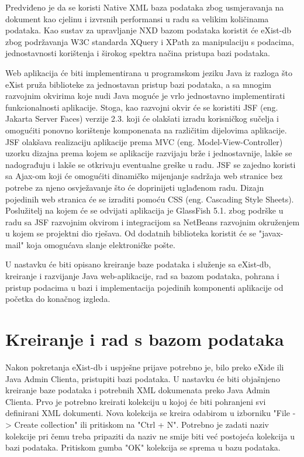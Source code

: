 \documentclass{foi}
\begin{document}
Predviđeno je da se koristi Native XML baza podataka zbog usmjeravanja na dokument kao cjelinu i izvrsnih performansi u radu sa velikim količinama podataka. Kao sustav za upravljanje NXD bazom podataka koristit će eXist-db zbog podržavanja W3C standarda XQuery i XPath za manipulaciju s podacima, jednostavnosti korištenja i širokog spektra načina pristupa bazi podataka.

Web aplikacija će biti implementirana u programskom jeziku Java iz razloga što eXist pruža biblioteke za jednostavan pristup bazi podataka, a sa mnogim razvojnim okvirima koje nudi Java moguće je vrlo jednostavno implementirati funkcionalnosti aplikacije. Stoga, kao razvojni okvir će se koristiti JSF (eng. Jakarta Server Faces) verzije 2.3. koji će olakšati izradu korisničkog sučelja i omogućiti ponovno korištenje komponenata na različitim dijelovima aplikacije. JSF olakšava realizaciju aplikacije prema MVC (eng. Model-View-Controller) uzorku dizajna prema kojem se aplikacije razvijaju brže i jednostavnije, lakše se nadograđuju i lakše se otkrivaju eventualne greške u radu. JSF se zajedno koristi sa Ajax-om koji će omogućiti dinamičko mijenjanje sadržaja web stranice bez potrebe za njeno osvježavanje što će doprinijeti uglađenom radu. Dizajn pojedinih web stranica će se izraditi pomoću CSS (eng. Cascading Style Sheets). Poslužitelj na kojem će se odvijati aplikacija je GlassFish 5.1. zbog podrške u radu sa JSF razvojnim okvirom i integracijom sa NetBeans razvojnim okruženjem u kojem se projektni dio rješava. Od dodatnih biblioteka koristit će se "javax-mail" koja omogućava slanje elektroničke pošte.

U nastavku će biti opisano kreiranje baze podataka i služenje sa eXist-db, kreiranje i razvijanje Java web-aplikacije, rad sa bazom podataka, pohrana i pristup podacima u bazi i implementacija pojedinih komponenti aplikacije od početka do konačnog izgleda.

\section{Kreiranje i rad s bazom podataka}

Nakon pokretanja eXist-db i uspješne prijave potrebno je, bilo preko eXide ili Java Admin Clienta, pristupiti bazi podataka. U nastavku će biti objašnjeno kreiranje baze podataka i potrebnih XML dokumenata preko Java Admin Clienta. Prvo je potrebno kreirati kolekciju u kojoj će biti pohranjeni svi definirani XML dokumenti. Nova kolekcija se kreira odabirom u izborniku "File -> Create collection" ili pritiskom na "Ctrl + N". Potrebno je zadati naziv kolekcije pri čemu treba pripaziti da naziv ne smije biti već postojeća kolekcija u bazi podataka. Pritiskom gumba "OK" kolekcija se sprema u bazu podataka. 
\end{document}
